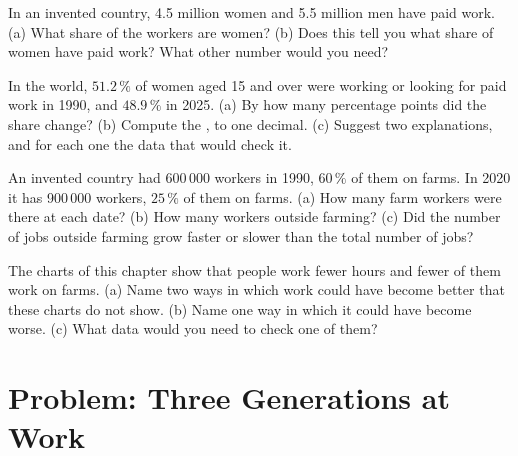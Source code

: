 \begin{exercise}[$\star\star$]\label{exo:g6:school-and-work:9}
In an invented country, 4.5 million women and 5.5 million men have paid work.
(a) What share of the workers are women? (b) Does this tell you what share of
women have paid work? What other number would you need?
\end{exercise}

\begin{exercise}[$\star\star\star$]\label{exo:g6:school-and-work:10}
In the world, $51.2\,\%$ of women aged 15 and over were working or looking for
paid work in 1990, and $48.9\,\%$ in 2025. (a) By how many percentage points did
the share change? (b) Compute the , to one decimal. (c) Suggest
two explanations, and for each one the data that would check it.
\end{exercise}

\begin{exercise}[$\star\star\star$]\label{exo:g6:school-and-work:11}
An invented country had 600\,000 workers in 1990, $60\,\%$ of them on farms. In
2020 it has 900\,000 workers, $25\,\%$ of them on farms. (a) How many farm
workers were there at each date? (b) How many workers outside farming? (c) Did
the number of jobs outside farming grow faster or slower than the total number of
jobs?
\end{exercise}

\begin{exercise}[$\star\star\star$]\label{exo:g6:school-and-work:12}
The charts of this chapter show that people work fewer hours and fewer of them
work on farms. (a) Name two ways in which work could have become better that
these charts do not show. (b) Name one way in which it could have become worse.
(c) What data would you need to check one of them?
\end{exercise}

\section{Problem: Three Generations at Work}

